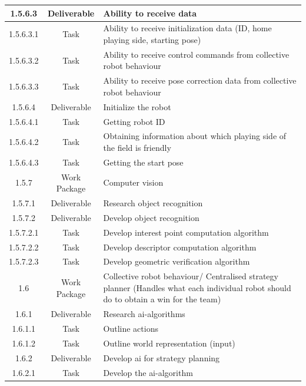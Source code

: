 \begin{longtable}{|c|c|m{}|}
    \rowcolor{c1-d} 1.5.6.3 & Deliverable & Ability to receive data \\ \hline
    \rowcolor{c1-t} 1.5.6.3.1 & Task & Ability to receive initialization data (ID, home playing side, starting pose) \\ \hline
    \rowcolor{c1-t}1.5.6.3.2 & Task & Ability to receive control commands from collective robot behaviour \\ \hline
    \rowcolor{c1-t} 1.5.6.3.3 & Task & Ability to receive pose correction data from collective robot behaviour \\ \hline
    \rowcolor{c1-d} 1.5.6.4 & Deliverable & Initialize the robot \\ \hline
    \rowcolor{c1-t} 1.5.6.4.1 & Task & Getting robot ID \\ \hline
    \rowcolor{c1-t} 1.5.6.4.2 & Task & Obtaining information about which playing side of the field is friendly \\ \hline
    \rowcolor{c1-t} 1.5.6.4.3 & Task & Getting the start pose \\ \hline
    \rowcolor{c1-wp} 1.5.7 & Work Package & Computer vision \\ \hline
    \rowcolor{c1-d} 1.5.7.1 & Deliverable & Research object recognition \\ \hline
    \rowcolor{c1-d} 1.5.7.2 & Deliverable & Develop object recognition \\ \hline
    \rowcolor{c1-t} 1.5.7.2.1 & Task & Develop interest point computation algorithm \\ \hline
    \rowcolor{c1-t} 1.5.7.2.2 & Task & Develop descriptor computation algorithm \\ \hline
    \rowcolor{c1-t} 1.5.7.2.3 & Task & Develop geometric verification algorithm \\ \hline
    \rowcolor{c1-wp} 1.6 & Work Package & Collective robot behaviour/ Centralised strategy planner (Handles what each individual robot should do to obtain a win for the team) \\ \hline
    \rowcolor{c1-d} 1.6.1 & Deliverable & Research \acs{ai}-algorithms \\ \hline
    \rowcolor{c1-t} 1.6.1.1 & Task & Outline actions \\ \hline
    \rowcolor{c1-t} 1.6.1.2 & Task & Outline world representation (input) \\ \hline
    \rowcolor{c1-d} 1.6.2 & Deliverable & Develop \acs{ai} for strategy planning \\ \hline
    \rowcolor{c1-t} 1.6.2.1 & Task & Develop the \acs{ai}-algorithm \\ \hline

\end{longtable}

